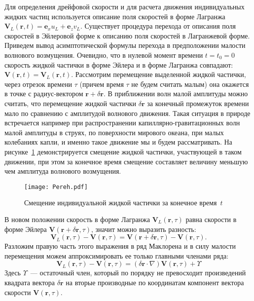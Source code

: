 Для определения дрейфовой скорости и для расчета движения индивидуальных жидких частиц используется описание поля скоростей в форме Лагранжа $ \mathbf{V}_{L}\left( \mathbf{r}, t\right) = \mathbf{e}_{x} u_{L}+ \mathbf{e}_{z} v_{L}$. Существует процедура перехода от описания поля скоростей в Эйлеровой форме к описанию поля скоростей в Лагранжевой форме. Приведем вывод асимптотической формулы перехода в предположении малости волнового возмущения. Очевидно, что в нулевой момент времени $ t=t_{0}=0 $ скорость жидкой частички в форме Эйлера и в форме Лагранжа совпадают: $ \mathbf{V}\left( \mathbf{r}, t\right)=\mathbf{V}_{L}\left( \mathbf{r}, t\right)$. Рассмотрим перемещение выделенной жидкой частички, через отрезок времени $ \tau $ (причем время $ \tau $ не будем считать малым) она окажется в точке с радиус-вектором $ \mathbf{r}+\delta \mathbf{r} $. В приближении волн малой амплитуды можно считать, что перемещение жидкой частички $ \delta \mathbf{r} $ за конечный промежуток времени мало по сравнению с амплитудой волнового движения. Такая ситуация в природе встречается например при распространении капиллярно-гравитационных волн малой амплитуды в струях, по поверхности мирового океана, при малых колебаниях капли, и именно такое движение мы и будем рассматривать. На рисунке~\ref{fig:Pereh} демонстрируется смещение жидкой частички, участвующей в таком движении, при этом за конечное время смещение составляет величину меньшую чем амплитуда волнового возмущения. 
\begin{figure}[ht]
\centering
\texttt{[image: Pereh.pdf]}
\caption{Смещение индивидуальной жидкой частички за конечное время~$ t $}\label{fig:Pereh}
\end{figure}
В новом положении скорость в форме Лагранжа $ \mathbf{V}_{L}\left( \mathbf{r}, \tau\right) $ равна скорости в форме Эйлера $ \mathbf{V}\left( \mathbf{r}+\delta \mathbf{r}, \tau \right) $, значит можно выразить разность: \[ \mathbf{V}_{L}\left( \mathbf{r}, \tau\right)-  \mathbf{V}\left( \mathbf{r}, \tau \right) = \mathbf{V}\left( \mathbf{r}+\delta \mathbf{r}, \tau \right) - \mathbf{V}\left( \mathbf{r}, \tau \right). \] Разложим правую часть этого выражения в ряд Маклорена и в силу малости перемещения  можем аппроксимировать ее только главными членами ряда: 
\begin{equation}
\mathbf{V}_{L}\left( \mathbf{r}, \tau\right)-  \mathbf{V}\left( \mathbf{r}, \tau \right) = \left( \delta \mathbf{r} \cdot \nabla \right) \mathbf{V}\left( \mathbf{r}, \tau \right) + \Upsilon
\label{Macloren}
\end{equation}
Здесь $ \Upsilon $~--- остаточный член, который по порядку не превосходит произведений квадрата вектора $ \delta \mathbf{r} $ на вторые производные по координатам компонент вектора скорости $ \mathbf{V}\left( \mathbf{r}, \tau \right) $. 

